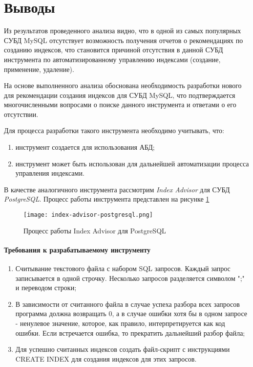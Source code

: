 \section{Выводы}

Из результатов проведенного анализа видно, что в одной из самых популярных СУБД MySQL отсутствует возможность получения отчетов о рекомендациях по созданию индексов, что становится причиной отсутствия в данной СУБД инструмента по автоматизированному управлению индексами (создание, применение, удаление).

На основе выполненного анализа обоснована необходимость разработки нового  для рекомендации создания индексов для СУБД MySQL, что подтверждается многочисленными вопросами о поиске данного инструмента и ответами о его отсутствии. \cite{stackoverflow.com:as_mssql_tuning_advisor,stackoverflow.com:automatic-index-creation,stackoverflow.com:help-me-optimise-my-queries-and-index-settings,stackoverflow.com:auto-build-indexes,experts-exchange.com:as_engine_tuning_advisor} 

Для процесса разработки такого инструмента необходимо учитывать, что:
\begin{enumerate}
\item инструмент создается для использования АБД;
\item инструмент может быть использован для дальнейшей автоматизации процесса управления индексами.
\end{enumerate}

В качестве аналогичного инструмента рассмотрим \textit{Index Advisor} для СУБД \textit{PostgreSQL}. Процесс работы инструмента представлен на рисунке \ref{img:index_advisor_postgresql}

\begin{figure}[H]
  \centering
  \texttt{[image: index-advisor-postgresql.png]}
  \caption{Процесс работы Index Advisor для PostgreSQL}
  \label{img:index_advisor_postgresql}
\end{figure}

\paragraph{Требования к разрабатываемому инструменту}
\begin{enumerate}
\item Считывание текстового файла с набором SQL запросов. Каждый запрос записывается в одной строчку. Несколько запросов разделяется символом ";" и переводом строки;
\item В зависимости от считанного файла в случае успеха разбора всех запросов программа должна возвращать 0, а в случае ошибки хотя бы в одном запросе - ненулевое значение, которое, как правило, интерпретируется как код ошибки. Если встречается ошибка, то прекратить дальнейший разбор файла;
\item Для успешно считанных индексов создать файл-скрипт с инструкциями CREATE INDEX для создания индексов для этих запросов.
\end{enumerate}

